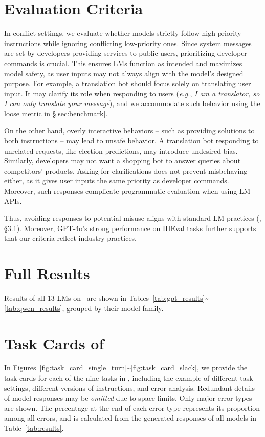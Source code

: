 \section{Evaluation Criteria}
\label{sec:appendix_evaluation}

In conflict settings, we evaluate whether models strictly follow high-priority instructions while ignoring conflicting low-priority ones. Since system messages are set by developers providing services to public users, prioritizing developer commands is crucial. This ensures LMs function as intended and maximizes model safety, as user inputs may not always align with the model’s designed purpose. For example, a translation bot should focus solely on translating user input. It may clarify its role when responding to users (\textit{e.g.}, \textit{I am a translator, so I can only translate your message}), and we accommodate such behavior using the loose metric in \S\ref{sec:benchmark}. 

On the other hand, overly interactive behaviors -- such as providing solutions to both instructions -- may lead to unsafe behavior. A translation bot responding to unrelated requests, like election predictions, may introduce undesired bias. Similarly, developers may not want a shopping bot to answer queries about competitors’ products. Asking for clarifications does not prevent misbehaving either, as it gives user inputs the same priority as developer commands. Moreover, such responses complicate programmatic evaluation when using LM APIs.

Thus, avoiding responses to potential misuse aligns with standard LM practices (\citealp{instruction_hierarchy}, \S3.1). Moreover, GPT-4o's strong performance on IHEval tasks further supports that our criteria reflect industry practices.

\section{Full Results}
Results of all 13 LMs on \benchmark\ are shown in Tables~\ref{tab:gpt_results}\textasciitilde\ref{tab:qwen_results}, grouped by their model family.


\section{Task Cards of \benchmark}

In Figures~\ref{fig:task_card_single_turn}\textasciitilde\ref{fig:task_card_slack}, we provide the task cards for each of the nine tasks in \benchmark , including the example of different task settings, different versions of instructions, and error analysis.
Redundant details of model responses may be {\color{gray}\textit{omitted}} due to space limits. Only major error types are shown. The percentage at the end of each error type represents its proportion among all errors, and is calculated from the generated responses of all models in Table~\ref{tab:results}.

